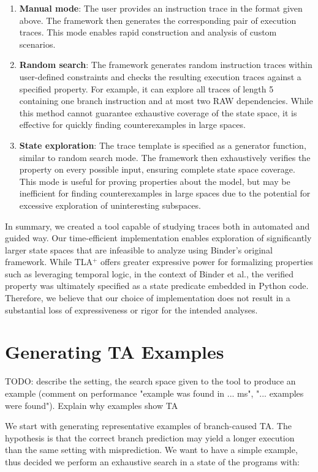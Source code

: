 \begin{enumerate}
	\item \textbf{Manual mode}: The user provides an instruction trace in the format given above. The framework then generates the corresponding pair of execution traces. This mode enables rapid construction and analysis of custom scenarios.
	\item \textbf{Random search}: The framework generates random instruction traces within user-defined constraints and checks the resulting execution traces against a specified property. For example, it can explore all traces of length 5 containing one branch instruction and at most two RAW dependencies. While this method cannot guarantee exhaustive coverage of the state space, it is effective for quickly finding counterexamples in large spaces.
	\item \textbf{State exploration}: The trace template is specified as a generator function, similar to random search mode. The framework then exhaustively verifies the property on every possible input, ensuring complete state space coverage. This mode is useful for proving properties about the model, but may be inefficient for finding counterexamples in large spaces due to the potential for excessive exploration of uninteresting subspaces.
\end{enumerate}


In summary, we created a tool capable of studying traces both in automated and guided way. Our time-efficient implementation enables exploration of significantly larger state spaces that are infeasible to analyze using Binder's original framework. While TLA$^+$ offers greater expressive power for formalizing properties such as leveraging temporal logic, in the context of Binder et al., the verified property was ultimately specified as a state predicate embedded in Python code. Therefore, we believe that our choice of implementation does not result in a substantial loss of expressiveness or rigor for the intended analyses.

\section{Generating TA Examples}

TODO: describe the setting, the search space given to the tool to produce an example (comment on performance "example was found in ... ms", "... examples were found"). Explain why examples show TA

We start with generating representative examples of branch-caused TA. The hypothesis is that the correct branch prediction may yield a longer execution than the same setting with misprediction. We want to have a simple example, thus decided we perform an exhaustive search in a state of the programs with:

